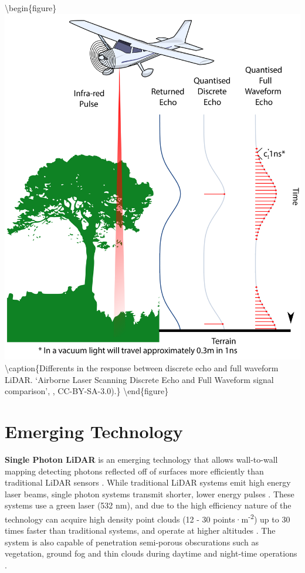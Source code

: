 \documentclass[
]{book}
\begin{document}
\textbackslash begin\{figure\}
\includegraphics[width=0.7\linewidth]{images/15-LiDAR-Discrete-Full-Waveform} \textbackslash caption\{Differents in the response between discrete echo and full waveform LiDAR. `Airborne Laser Scanning Discrete Echo and Full Waveform signal comparison', \citet{beck_airborne_2012}, CC-BY-SA-3.0).\}\label{fig:15-LiDAR-Discrete-Full-Waveform}
\textbackslash end\{figure\}

\hypertarget{emerging-technology}{%
\section{Emerging Technology}\label{emerging-technology}}

\textbf{Single Photon LiDAR} is an emerging technology that allows wall-to-wall mapping detecting photons reflected off of surfaces more efficiently than traditional LiDAR sensors \citep{swatantran_rapid_2016}. While traditional LiDAR systems emit high energy laser beams, single photon systems transmit shorter, lower energy pulses \citep{swatantran_rapid_2016}. These systems use a green laser (532 nm), and due to the high efficiency nature of the technology can acquire high density point clouds (12 - 30 points·m\textsuperscript{-2}) up to 30 times faster than traditional systems, and operate at higher altitudes \citep{swatantran_rapid_2016}. The system is also capable of penetration semi-porous obscurations such as vegetation, ground fog and thin clouds during daytime and night-time operations \citep{swatantran_rapid_2016}.
\end{document}
